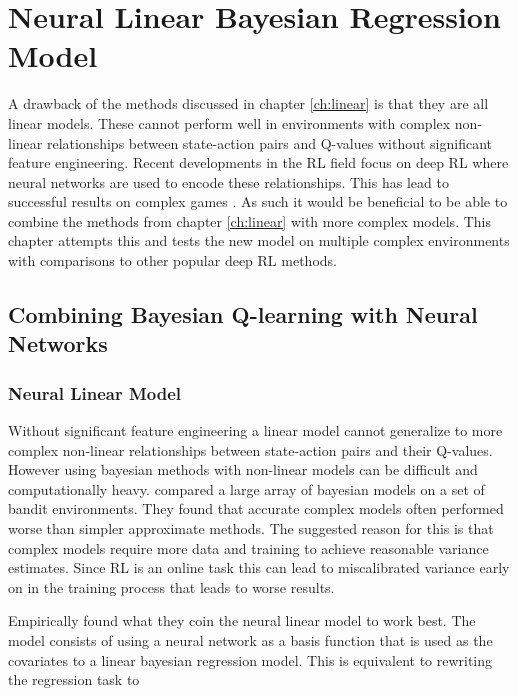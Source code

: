 
\chapter{Neural Linear Bayesian Regression Model}\label{ch:bdqn}

A drawback of the methods discussed in chapter \ref{ch:linear} is that they are all linear models. These cannot perform well in environments with complex non-linear relationships between state-action pairs and Q-values without significant feature engineering. Recent developments in the RL field focus on deep RL where neural networks are used to encode these relationships. This has lead to successful results on complex games \citep{mnih_2015, mnih_2016,silver_2017}. As such it would be beneficial to be able to combine the methods from chapter \ref{ch:linear} with more complex models. This chapter attempts this and tests the new model on multiple complex environments with comparisons to other popular deep RL methods.

\section{Combining Bayesian Q-learning with Neural Networks}

\subsection{Neural Linear Model}

Without significant feature engineering a linear model cannot generalize to more complex non-linear relationships between state-action pairs and their Q-values. However using bayesian methods with non-linear models can be difficult and computationally heavy. \cite{carlos_2018} compared a large array of bayesian models on a set of bandit environments. They found that accurate complex models often performed worse than simpler approximate methods. The suggested reason for this is that complex models require more data and training to achieve reasonable variance estimates. Since RL is an online task this can lead to miscalibrated variance early on in the training process that leads to worse results.

Empirically \cite{carlos_2018} found what they coin the neural linear model to work best. The model consists of using a neural network as a basis function that is used as the covariates to a linear bayesian regression model. This is equivalent to rewriting the regression task to 

